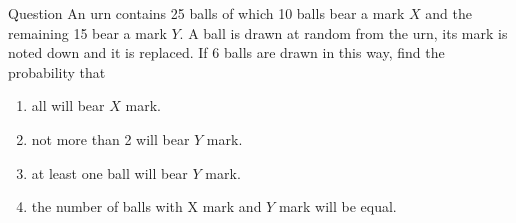 \documentclass[journal,12pt,twocolumn]{IEEEtran}
\theoremstyle{remark}
\begin{document}
\let\vec\mathbf




\vspace{3cm}



\bigskip

\renewcommand{\thefigure}{\theenumi}
\renewcommand{\thetable}{\theenumi}
Question  An urn contains 25 balls of which 10 balls bear a mark $X$ and the remaining 15 bear a mark $Y$. A ball is drawn at random from the urn, its mark is noted down and it is replaced. If 6 balls are drawn in this way, find the probability that\\
\begin{enumerate}
\item all will bear $X$ mark.\\
\item not more than 2 will bear $Y$ mark.\\
\item at least one ball will bear $Y$ mark.\\
\item the number of balls with X mark and $Y$ mark will be equal.\\
\end{enumerate}
\solution  \\
\end{document}
